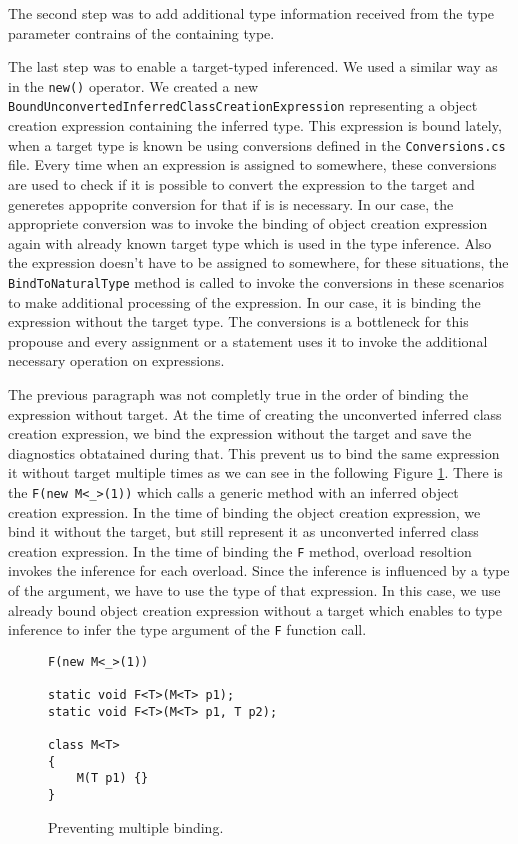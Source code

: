 \par
The second step was to add additional type information received from the type parameter contrains of the containing type.
\par
The last step was to enable a target-typed inferenced.
We used a similar way as in the \texttt{new()} operator.
We created a new \texttt{BoundUnconvertedInferredClassCreationExpression} representing a object creation expression containing the inferred type.
This expression is bound lately, when a target type is known be using conversions defined in the \texttt{Conversions.cs} file.
Every time when an expression is assigned to somewhere, these conversions are used to check if it is possible to convert the expression to the target and generetes appoprite conversion for that if is is necessary.
In our case, the appropriete conversion was to invoke the binding of object creation expression again with already known target type which is used in the type inference.
Also the expression doesn't have to be assigned to somewhere, for these situations, the \texttt{BindToNaturalType} method is called to invoke the conversions in these scenarios to make additional processing of the expression.
In our case, it is binding the expression without the target type.
The conversions is a bottleneck for this propouse and every assignment or a statement uses it to invoke the additional necessary operation on expressions.
\par
The previous paragraph was not completly true in the order of binding the expression without target.
At the time of creating the unconverted inferred class creation expression, we bind the expression without the target and save the diagnostics obtatained during that.
This prevent us to bind the same expression it without target multiple times as we can see in the following Figure \ref{img71:binding}.
There is the \texttt{F(new M<\_>(1))} which calls a generic method with an inferred object creation expression.
In the time of binding the object creation expression, we bind it without the target, but still represent it as unconverted inferred class creation expression.
In the time of binding the \texttt{F} method, overload resoltion invokes the inference for each overload.
Since the inference is influenced by a type of the argument, we have to use the type  of that expression.
In this case, we use already bound object creation expression without a target which enables to type inference to infer the type argument of the \texttt{F} function call.
\begin{figure}[h]
\begin{lstlisting}[style=csharp, showstringspaces=false]
F(new M<_>(1))

static void F<T>(M<T> p1);
static void F<T>(M<T> p1, T p2);

class M<T> 
{
    M(T p1) {}
}
\end{lstlisting}
\caption{Preventing multiple binding.}
\label{img71:binding}
\end{figure}
